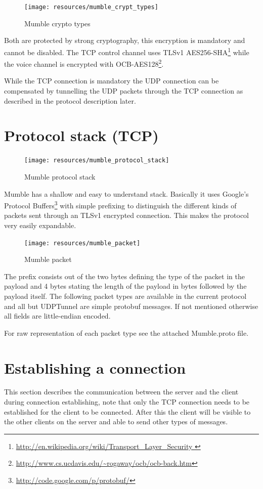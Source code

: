 \documentclass[11pt]{article} %
\begin{document}
\begin{figure}[ht]
	\centering
	\texttt{[image: resources/mumble\_crypt\_types]}
	\caption{Mumble crypto types}
	\label{fig:mumble_crypt_types}
\end{figure}

Both are protected by strong cryptography, this encryption is mandatory and cannot be disabled. The TCP control channel uses TLSv1 AES256-SHA\footnote{\url{http://en.wikipedia.org/wiki/Transport_Layer_Security }} while the voice channel is encrypted with OCB-AES128\footnote{\url{http://www.cs.ucdavis.edu/~rogaway/ocb/ocb-back.htm}}.

While the TCP connection is mandatory the UDP connection can be compensated by tunnelling the UDP packets through the TCP connection as described in the protocol description later.

\section{Protocol stack (TCP)}

\begin{figure}[ht]
	\centering
	\texttt{[image: resources/mumble\_protocol\_stack]}
	\caption{Mumble protocol stack}
	\label{fig:mumble_protocol_stack}
\end{figure}

Mumble has a shallow and easy to understand stack. Basically it uses Google's Protocol Buffers\footnote{\url{http://code.google.com/p/protobuf/}} with simple prefixing to distinguish the different kinds of packets sent through an TLSv1 encrypted connection. This makes the protocol very easily expandable.

\begin{figure}[ht]
	\centering
	\texttt{[image: resources/mumble\_packet]}
	\caption{Mumble packet}
	\label{fig:mumble_packet}
\end{figure}

The prefix consists out of the two bytes defining the type of the packet in the payload and 4 bytes stating the length of the payload in bytes followed by the payload itself. The following packet types are available in the current protocol and all but UDPTunnel are simple protobuf messages. If not mentioned otherwise all fields are little-endian encoded.


For raw representation of each packet type see the attached Mumble.proto file.

\section{Establishing a connection}
This section describes the communication between the server and the client during connection establishing, note that only the TCP connection needs to be established for the client to be connected. After this the client will be visible to the other clients on the server and able to send other types of messages.
\end{document}
